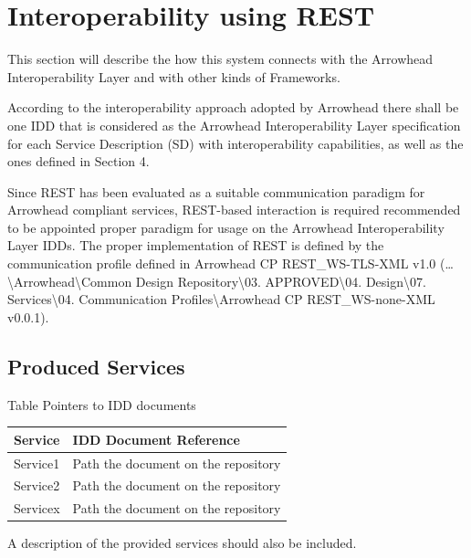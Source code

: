 \documentclass{article}
\newcounter{Table}
\renewcommand\theTable{\arabic{Table}}
\begin{document}
\section[Interoperability using REST]{Interoperability using REST}
This section will describe the how this system connects with the Arrowhead Interoperability Layer and with other kinds of Frameworks.

According to the interoperability approach adopted by Arrowhead there shall be one IDD that is considered as the Arrowhead Interoperability Layer specification for each Service Description (SD) with interoperability capabilities, as well as the ones defined in Section 4.

Since REST has been evaluated as a suitable communication paradigm for Arrowhead compliant services, REST{}-based interaction is required recommended to be appointed proper paradigm for usage on the Arrowhead Interoperability Layer IDDs. The proper implementation of REST is defined by the communication profile defined in Arrowhead CP REST\_WS-TLS-XML v1.0 ({\dots}{\textbackslash}Arrowhead{\textbackslash}Common Design Repository{\textbackslash}03. APPROVED{\textbackslash}04. Design{\textbackslash}07. Services{\textbackslash}04. Communication Profiles{\textbackslash}Arrowhead CP REST\_WS-none-XML v0.0.1).

\subsection[Produced Services]{Produced Services}
Table \stepcounter{Table}{\theTable} Pointers to IDD documents

\begin{flushleft}
\tablefirsthead{}
\tablehead{}
\tabletail{}
\tablelasttail{}
\begin{supertabular}{|m{2.12756in}|m{3.80526in}|}
\hline
{ Service} &
{ IDD Document Reference}\\\hline
{ Service1} &
{ Path the document on the repository}\\\hline
{ Service2} &
{ Path the document on the repository}\\\hline
{ Servicex} &
{ Path the document on the repository}\\\hline
\end{supertabular}
\end{flushleft}
A description of the provided services should also be included.
\end{document}
